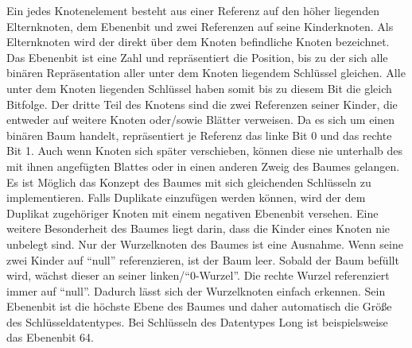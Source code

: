\documentclass[a4paper,11pt,oneside,%
headsepline,												%
footsepline,												%
bibtotocnumbered									%
]{scrreprt}
\begin{document}
Ein jedes Knotenelement besteht aus einer Referenz auf den höher liegenden Elternknoten, dem Ebenenbit  und zwei Referenzen auf seine Kinderknoten. 
Als Elternknoten wird der direkt über dem Knoten befindliche Knoten bezeichnet. Das Ebenenbit ist eine Zahl und repräsentiert die Position, bis zu der sich alle binären Repräsentation aller unter dem Knoten liegendem Schlüssel gleichen.  Alle unter dem Knoten liegenden Schlüssel haben somit bis zu diesem Bit die gleich Bitfolge. Der dritte Teil des Knotens sind die zwei Referenzen seiner Kinder, die entweder auf weitere Knoten oder/sowie Blätter verweisen. Da es sich um einen binären Baum handelt, repräsentiert je Referenz das linke Bit 0 und das rechte Bit 1. Auch wenn Knoten sich später verschieben, können diese nie unterhalb des mit ihnen angefügten Blattes oder in einen anderen Zweig des Baumes gelangen. Es ist Möglich das Konzept des Baumes mit sich gleichenden Schlüsseln zu implementieren. Falls Duplikate einzufügen werden können, wird der dem Duplikat zugehöriger Knoten mit einem negativen Ebenenbit versehen. Eine weitere Besonderheit des Baumes liegt darin, dass die Kinder eines Knoten nie unbelegt sind. Nur der Wurzelknoten des Baumes ist eine Ausnahme. Wenn seine zwei Kinder auf \enquote{null} referenzieren, ist der Baum leer. Sobald der Baum befüllt wird, wächst dieser an seiner linken/\enquote{0-Wurzel}. Die rechte Wurzel referenziert immer auf \enquote{null}. Dadurch lässt sich der Wurzelknoten einfach erkennen.
Sein Ebenenbit ist die höchste Ebene des Baumes und daher automatisch die Größe des Schlüsseldatentypes. Bei Schlüsseln des Datentypes Long ist beispielsweise das Ebenenbit 64.\\
\end{document}

